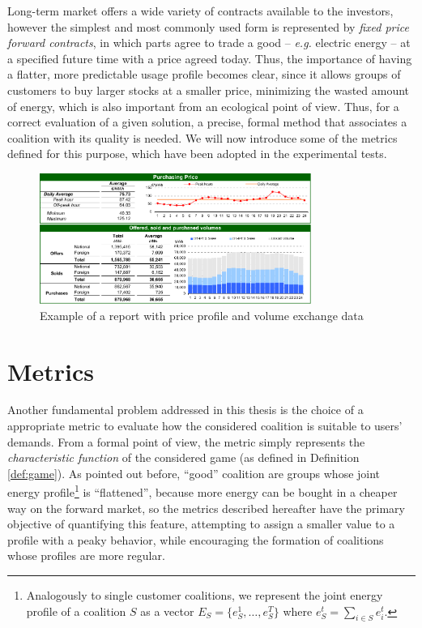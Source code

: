 \documentclass[11pt, twoside, titlepage, a4paper, openright]{report}
\begin{document}
Long-term market offers a wide variety of contracts available to the investors, however the simplest and most commonly used form is represented by \textit{fixed price forward contracts}, in which parts agree to trade a good -- \textit{e.g.} electric energy -- at a specified future time with a price agreed today. Thus, the importance of having a flatter, more predictable usage profile becomes clear, since it allows groups of customers to buy larger stocks at a smaller price, minimizing the wasted amount of energy, which is also important from an ecological point of view.
Thus, for a correct evaluation of a given solution, a precise, formal method that associates a coalition with its quality is needed. We will now introduce some of the metrics defined for this purpose, which have been adopted in the experimental tests.

\begin{figure}[!h]
	\centering
	\includegraphics[width=0.79\textwidth]{img/day_ahead.pdf}
	\caption{\label{fig:energy_report}Example of a report with price profile and volume exchange data}
\end{figure}

\section{Metrics}\label{sec:metric}

Another fundamental problem addressed in this thesis is the choice of a appropriate metric to evaluate how the considered coalition is suitable to users' demands. From a formal point of view, the metric simply represents the \textit{characteristic function} of the considered game (as defined in Definition \ref{def:game}). As pointed out before, ``good'' coalition are groups whose joint energy profile\footnote{Analogously to single customer coalitions, we represent the joint energy profile of a coalition $S$ as a vector $E_S=\{e^1_S,\ldots,e^T_S\}$ where $e^t_S=\sum_{i\in S}e^t_i$.} is ``flattened'', because more energy can be bought in a cheaper way on the forward market, so the metrics described hereafter have the primary objective of quantifying this feature, attempting to assign a smaller value to a profile with a peaky behavior, while encouraging the formation of coalitions whose profiles are more regular.
\end{document}
